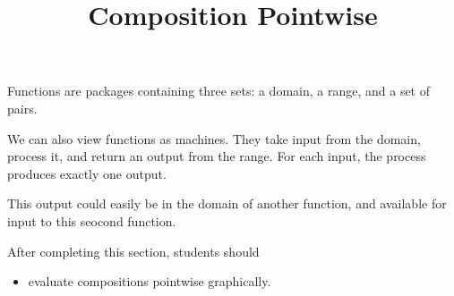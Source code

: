 \documentclass{ximera}
\title{Composition Pointwise}
\begin{document}
\begin{abstract}
\end{abstract}
\maketitle





Functions are packages containing three sets: a domain, a range, and a set of pairs.

We can also view functions as machines.  They take input from the domain, process it, and return an output from the range.  For each input, the process produces exactly one output.



This output could easily be in the domain of another function, and available for input to this seocond function.


















\begin{sectionOutcomes}
After completing this section, students should 

\begin{itemize}
\item evaluate compositions pointwise graphically.

\end{itemize}
\end{sectionOutcomes}
\end{document}
